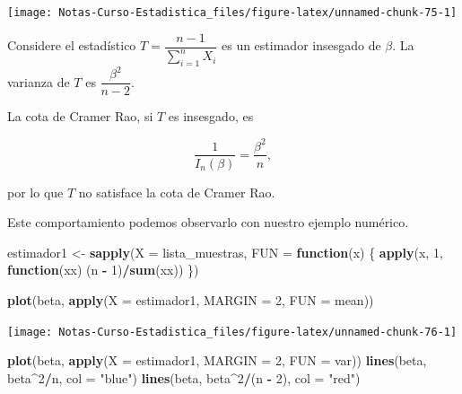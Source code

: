 \documentclass[
  12pt,
]{book}
\newenvironment{Shaded}{\begin{snugshade}}{\end{snugshade}}
\newcommand{\ControlFlowTok}[1]{\textcolor[rgb]{0.13,0.29,0.53}{\textbf{#1}}}
\newcommand{\DataTypeTok}[1]{\textcolor[rgb]{0.13,0.29,0.53}{#1}}
\newcommand{\DecValTok}[1]{\textcolor[rgb]{0.00,0.00,0.81}{#1}}
\newcommand{\KeywordTok}[1]{\textcolor[rgb]{0.13,0.29,0.53}{\textbf{#1}}}
\newcommand{\NormalTok}[1]{#1}
\newcommand{\OperatorTok}[1]{\textcolor[rgb]{0.81,0.36,0.00}{\textbf{#1}}}
\newcommand{\StringTok}[1]{\textcolor[rgb]{0.31,0.60,0.02}{#1}}
\begin{document}
\begin{center}\texttt{[image: Notas-Curso-Estadistica\_files/figure-latex/unnamed-chunk-75-1]} \end{center}

Considere el estadístico \(T = \dfrac{n-1}{\sum_{i=1}^n X_i}\) es un estimador insesgado de \(\beta\). La varianza de \(T\) es \(\dfrac{\beta^2}{n-2}\).

La cota de Cramer Rao, si \(T\) es insesgado, es

\[\dfrac 1{I_n(\beta)} = \dfrac{\beta^2}{n},\]

por lo que \(T\) no satisface la cota de Cramer Rao.

Este comportamiento podemos observarlo con nuestro ejemplo numérico.

\begin{Shaded}
\begin{Highlighting}[]
\NormalTok{estimador1 \textless{}{-}}\StringTok{ }\KeywordTok{sapply}\NormalTok{(}\DataTypeTok{X =}\NormalTok{ lista\_muestras, }\DataTypeTok{FUN =} \ControlFlowTok{function}\NormalTok{(x) \{}
    \KeywordTok{apply}\NormalTok{(x, }\DecValTok{1}\NormalTok{, }\ControlFlowTok{function}\NormalTok{(xx) (n }\OperatorTok{{-}}\StringTok{ }\DecValTok{1}\NormalTok{)}\OperatorTok{/}\KeywordTok{sum}\NormalTok{(xx))}
\NormalTok{\})}

\KeywordTok{plot}\NormalTok{(beta, }\KeywordTok{apply}\NormalTok{(}\DataTypeTok{X =}\NormalTok{ estimador1, }\DataTypeTok{MARGIN =} \DecValTok{2}\NormalTok{, }\DataTypeTok{FUN =}\NormalTok{ mean))}
\end{Highlighting}
\end{Shaded}

\begin{center}\texttt{[image: Notas-Curso-Estadistica\_files/figure-latex/unnamed-chunk-76-1]} \end{center}

\begin{Shaded}
\begin{Highlighting}[]
\KeywordTok{plot}\NormalTok{(beta, }\KeywordTok{apply}\NormalTok{(}\DataTypeTok{X =}\NormalTok{ estimador1, }\DataTypeTok{MARGIN =} \DecValTok{2}\NormalTok{, }\DataTypeTok{FUN =}\NormalTok{ var))}
\KeywordTok{lines}\NormalTok{(beta, beta}\OperatorTok{\^{}}\DecValTok{2}\OperatorTok{/}\NormalTok{n, }\DataTypeTok{col =} \StringTok{"blue"}\NormalTok{)}
\KeywordTok{lines}\NormalTok{(beta, beta}\OperatorTok{\^{}}\DecValTok{2}\OperatorTok{/}\NormalTok{(n }\OperatorTok{{-}}\StringTok{ }\DecValTok{2}\NormalTok{), }\DataTypeTok{col =} \StringTok{"red"}\NormalTok{)}
\end{Highlighting}
\end{Shaded}
\end{document}
